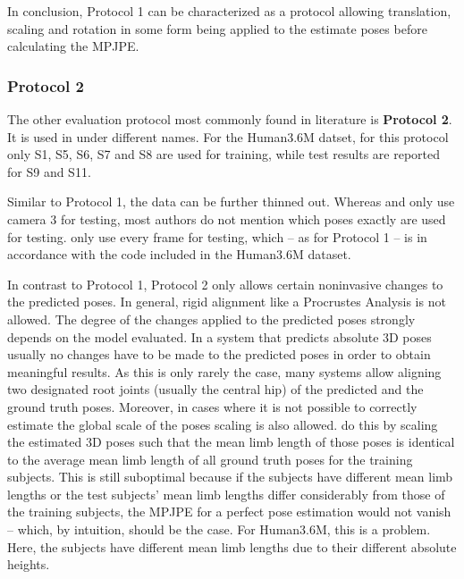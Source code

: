 In conclusion, Protocol 1 can be characterized as a protocol allowing translation, scaling and rotation in some form being applied to the estimate poses before calculating the MPJPE.

\subsubsection{Protocol 2}\label{sec:protocol2}

The other evaluation protocol most commonly found in literature is \textbf{Protocol 2}.
It is used in \cite{sun17, moreno-noguer16, bogo16, martinez17, zhou18, zhou16, tekin16, pavlakos17, sun17} under different names.
For the Human3.6M datset, for this protocol only S1, S5, S6, S7 and S8 are used for training, while test results are reported for S9 and S11.

Similar to Protocol 1, the data can be further thinned out.
Whereas \citet{moreno-noguer16} and \citet{bogo16} only use camera 3 for testing, most authors do not mention which poses exactly are used for testing.
\citet{sun17} only use every  frame for testing, which -- as for Protocol 1 -- is in accordance with the code included in the Human3.6M dataset.

In contrast to Protocol 1, Protocol 2 only allows certain noninvasive changes to the predicted poses.
In general, rigid alignment like a Procrustes Analysis is not allowed.
The degree of the changes applied to the predicted poses strongly depends on the model evaluated.
In a system that predicts absolute 3D poses usually no changes have to be made to the predicted poses in order to obtain meaningful results.
As this is only rarely the case, many systems \cite{martinez17, zhou18, zhou16, tekin16, pavlakos17} allow aligning two designated root joints (usually the central hip) of the predicted and the ground truth poses.
Moreover, in cases where it is not possible to correctly estimate the global scale of the poses scaling is also allowed.
\citet{zhou18} do this by scaling the estimated 3D poses such that the mean limb length of those poses is identical to the average mean limb length of all ground truth poses for the training subjects.
This is still suboptimal because if the subjects have different mean limb lengths or the test subjects' mean limb lengths differ considerably from those of the training subjects, the MPJPE for a perfect pose estimation would not vanish -- which, by intuition, should be the case.
For Human3.6M, this is a problem.
Here, the subjects have different mean limb lengths due to their different absolute heights.

